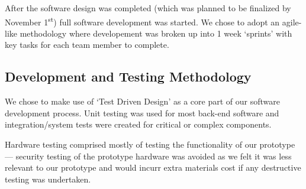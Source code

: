 \documentclass[conference]{IEEEtran}
\begin{document}
	After the software design was completed (which was planned to be finalized by November 1\textsuperscript{st}) full software development was started. We chose to adopt an agile-like methodology where developement was broken up into 1 week `sprints' with key tasks for each team member to complete.

\subsection{Development and Testing Methodology}
	We chose to make use of `Test Driven Design' as a core part of our software development process. Unit testing was used for most back-end software and integration/system tests were created for critical or complex components.

	Hardware testing comprised mostly of testing the functionality of our prototype --- security testing of the prototype hardware was avoided as we felt it was less relevant to our prototype and would incurr extra materials cost if any destructive testing was undertaken.
\end{document}

